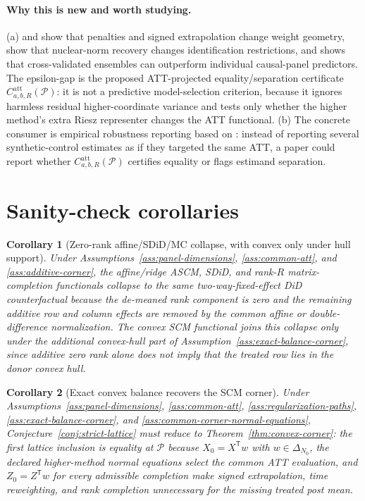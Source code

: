 \documentclass[11pt]{article}
\newcommand{\transpose}{\mathsf{T}}
\theoremstyle{definition}
\theoremstyle{plain}
\newtheorem{corollary}{Corollary}
\theoremstyle{remark}
\begin{document}
\paragraph{Why this is new and worth studying.}
(a) \citet{AbadieLHour2021} and \citet{BenMichaelFellerRothstein2021} show that penalties and signed extrapolation change weight geometry, \citet{AtheyBayatiDoudchenkoImbensKhosravi2021} show that nuclear-norm recovery changes identification restrictions, and \citet{AtheyBayatiImbensQu2019} shows that cross-validated ensembles can outperform individual causal-panel predictors. The epsilon-gap is the proposed ATT-projected equality/separation certificate \(C^{\mathrm{att}}_{a,b,R}(\mathcal P)\): it is not a predictive model-selection criterion, because it ignores harmless residual higher-coordinate variance and tests only whether the higher method's extra Riesz representer changes the ATT functional. (b) The concrete consumer is empirical robustness reporting based on \citet{Abadie2021}: instead of reporting several synthetic-control estimates as if they targeted the same ATT, a paper could report whether \(C^{\mathrm{att}}_{a,b,R}(\mathcal P)\) certifies equality or flags estimand separation.

\section{Sanity-check corollaries}

\begin{corollary}[Zero-rank affine/SDiD/MC collapse, with convex only under hull support]\label{cor:additive-collapse}
Under Assumptions~\ref{ass:panel-dimensions}, \ref{ass:common-att}, and \ref{ass:additive-corner}, the affine/ridge ASCM, SDiD, and rank-\(R\) matrix-completion functionals collapse to the same two-way-fixed-effect DiD counterfactual because the de-meaned rank component is zero and the remaining additive row and column effects are removed by the common affine or double-difference normalization. The convex SCM functional joins this collapse only under the additional convex-hull part of Assumption~\ref{ass:exact-balance-corner}, since additive zero rank alone does not imply that the treated row lies in the donor convex hull.
\end{corollary}

\begin{corollary}[Exact convex balance recovers the SCM corner]\label{cor:convex-scm-corner}
Under Assumptions~\ref{ass:panel-dimensions}, \ref{ass:common-att}, \ref{ass:regularization-paths}, \ref{ass:exact-balance-corner}, and \ref{ass:common-corner-normal-equations}, Conjecture~\ref{conj:strict-lattice} must reduce to Theorem~\ref{thm:convex-corner}: the first lattice inclusion is equality at \(\mathcal P\) because \(X_0=X^\transpose w\) with \(w\in\Delta_{N_0}\), the declared higher-method normal equations select the common ATT evaluation, and \(Z_0=Z^\transpose w\) for every admissible completion make signed extrapolation, time reweighting, and rank completion unnecessary for the missing treated post mean.
\end{corollary}
\end{document}
